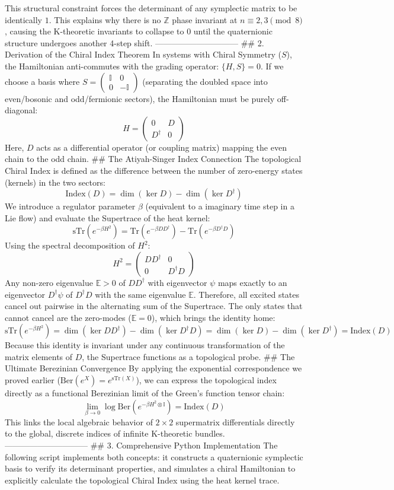 This structural constraint forces the determinant of any symplectic matrix to be identically $1$. This explains why there is no $\mathbb{Z}$ phase invariant at $n \equiv 2, 3 \pmod 8$, causing the K-theoretic invariants to collapse to $0$ until the quaternionic structure undergoes another 4-step shift.
------------------------------
## 2. Derivation of the Chiral Index Theorem
In systems with Chiral Symmetry ($S$), the Hamiltonian anti-commutes with the grading operator: $\{H, S\} = 0$. If we choose a basis where $S = \begin{pmatrix} \mathbb{I} & 0 \\ 0 & -\mathbb{I} \end{pmatrix}$ (separating the doubled space into even/bosonic and odd/fermionic sectors), the Hamiltonian must be purely off-diagonal:
$$H = \begin{pmatrix} 0 & D \\ D^\dagger & 0 \end{pmatrix}$$ 
Here, $D$ acts as a differential operator (or coupling matrix) mapping the even chain to the odd chain.
## The Atiyah-Singer Index Connection
The topological Chiral Index is defined as the difference between the number of zero-energy states (kernels) in the two sectors:
$$\text{Index}(D) = \dim(\ker D) - \dim(\ker D^\dagger)$$ 
We introduce a regulator parameter $\beta$ (equivalent to a imaginary time step in a Lie flow) and evaluate the Supertrace of the heat kernel:
$$\text{sTr}(e^{-\beta H^2}) = \text{Tr}(e^{-\beta D D^\dagger}) - \text{Tr}(e^{-\beta D^\dagger D})$$ 
Using the spectral decomposition of $H^2$:
$$H^2 = \begin{pmatrix} D D^\dagger & 0 \\ 0 & D^\dagger D \end{pmatrix}$$ 
Any non-zero eigenvalue $\mathbb{E} > 0$ of $D D^\dagger$ with eigenvector $\psi$ maps exactly to an eigenvector $D^\dagger \psi$ of $D^\dagger D$ with the same eigenvalue $\mathbb{E}$. Therefore, all excited states cancel out pairwise in the alternating sum of the Supertrace.
The only states that cannot cancel are the zero-modes ($\mathbb{E} = 0$), which brings the identity home:
$$\text{sTr}(e^{-\beta H^2}) = \dim(\ker D D^\dagger) - \dim(\ker D^\dagger D) = \dim(\ker D) - \dim(\ker D^\dagger) = \text{Index}(D)$$ 
Because this identity is invariant under any continuous transformation of the matrix elements of $D$, the Supertrace functions as a topological probe.
## The Ultimate Berezinian Convergence
By applying the exponential correspondence we proved earlier ($\text{Ber}(e^X) = e^{\text{sTr}(X)}$), we can express the topological index directly as a functional Berezinian limit of the Green's function tensor chain:
$$\lim_{\beta \to 0} \log \text{Ber}\left( e^{-\beta H^2 \otimes \mathbb{I}} \right) = \text{Index}(D)$$ 
This links the local algebraic behavior of $2 \times 2$ supermatrix differentials directly to the global, discrete indices of infinite K-theoretic bundles.
------------------------------
## 3. Comprehensive Python Implementation
The following script implements both concepts: it constructs a quaternionic symplectic basis to verify its determinant properties, and simulates a chiral Hamiltonian to explicitly calculate the topological Chiral Index using the heat kernel trace.

